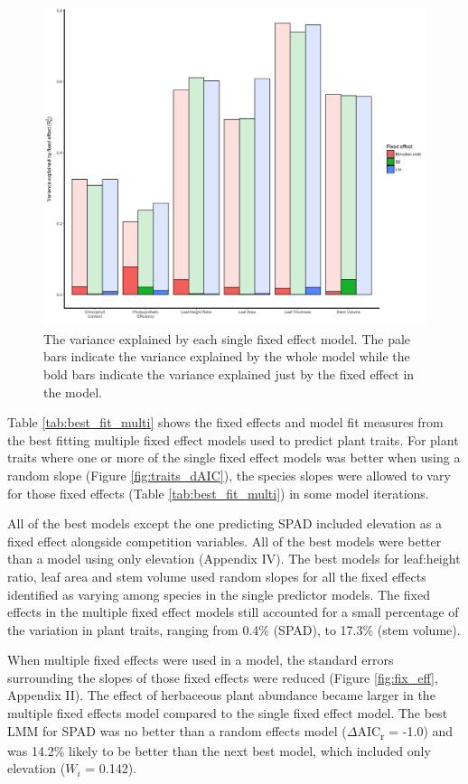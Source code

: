 \documentclass[a4paper,11pt]{article}
\begin{document}
\begin{figure}[H]
\includegraphics[width=\textwidth]{r2plot_ggplot}
\centering
\caption{The variance explained by each single fixed effect model. The pale bars indicate the variance explained by the whole model while the bold bars indicate the variance explained just by the fixed effect in the model.}
\label{fig:r2plot_ggplot}
\end{figure}

Table \ref{tab:best_fit_multi} shows the fixed effects and model fit measures from the best fitting multiple fixed effect models used to predict plant traits. For plant traits where one or more of the single fixed effect models was better when using a random slope (Figure \ref{fig:traits_dAIC}), the species slopes were allowed to vary for those fixed effects (Table \ref{tab:best_fit_multi}) in some model iterations. 

All of the best models except the one predicting SPAD included elevation as a fixed effect alongside competition variables. All of the best models were better than a model using only elevation (Appendix IV). The best models for leaf:height ratio, leaf area and stem volume used random slopes for all the fixed effects identified as varying among species in the single predictor models. The fixed effects in the multiple fixed effect models still accounted for a small percentage of the variation in plant traits, ranging from 0.4\% (SPAD), to 17.3\% (stem volume).

When multiple fixed effects were used in a model, the standard errors surrounding the slopes of those fixed effects were reduced (Figure \ref{fig:fix_eff}, Appendix II). The effect of herbaceous plant abundance became larger in the multiple fixed effects model compared to the single fixed effect model. The best LMM for SPAD was no better than a random effects model ($\Delta$AIC\textsubscript{r} = -1.0) and was 14.2\% likely to be better than the next best model, which included only elevation ($W_i$ = 0.142).
\end{document}
